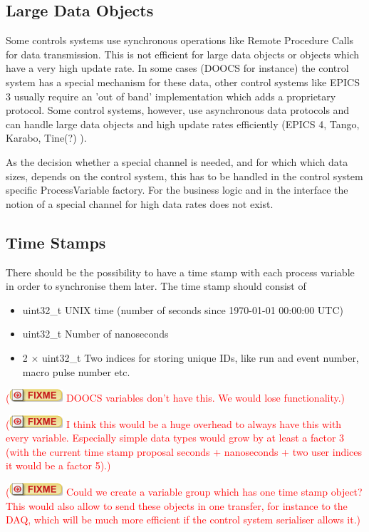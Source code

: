 \documentclass[11pt,a4paper]{scrartcl}
\newcounter{nFixmes}
\newcommand{\fixme}[1]{\addtocounter{nFixmes}{1}\textcolor{red}{(\includegraphics[height=2ex]{fixme} #1)}\xspace}
\begin{document}
\subsection{Large Data Objects}

Some controls systems use synchronous operations like Remote Procedure Calls
for data transmission. This is not efficient for large data objects or objects
which have a very high update rate. In some cases (DOOCS for instance) the
control system has a special mechanism for these data, other control systems
like EPICS 3 usually require an 'out of band' implementation which adds a
proprietary protocol. Some control systems, however, use asynchronous data
protocols and can handle large data objects and high update rates efficiently
(EPICS 4, Tango, Karabo, Tine(?) ).

As the decision whether a special channel is needed, and for which which data sizes, depends on
the control system, this has to be handled in the control system specific
ProcessVariable factory. For the business logic and in the interface the
notion of a special channel for high data rates does not exist.

\subsection{Time Stamps}
There should be the possibility to have a time stamp with each process variable in order to
synchronise them later. The time stamp should consist of
\begin{itemize}
  \item uint32\_t UNIX time (number of seconds since 1970-01-01 00:00:00 UTC)
  \item uint32\_t Number of nanoseconds
  \item 2 $\times$ uint32\_t Two indices for storing unique IDs, like run and event number, macro pulse number etc.
\end{itemize}
\fixme{DOOCS variables don't have this. We would lose functionality.}

\fixme{I think this would be a huge overhead to always have this with every variable. Especially
  simple data types would grow by at least a factor 3 (with the current time stamp proposal
 seconds + nanoseconds + two user indices it would be a factor 5).}

\fixme{Could we create a variable group which has one time stamp object? This would also
  allow to send these objects in one transfer, for instance to the DAQ, which will be much more
  efficient if the control system serialiser allows it.}
\end{document}

